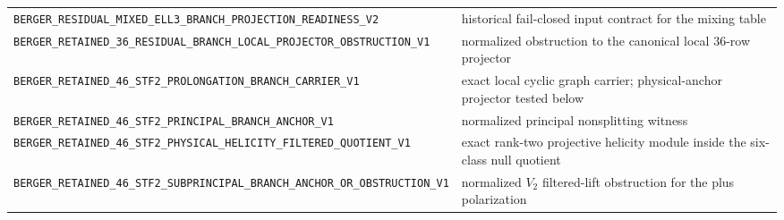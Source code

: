 \documentclass[11pt]{article}
\theoremstyle{definition}
\theoremstyle{remark}
\newcommand{\cert}[1]{\nolinkurl{#1}}
\begin{document}
\begin{center}
\begin{tabularx}{\textwidth}{>{\small}p{}Y}
\cert{BERGER_RESIDUAL_MIXED_ELL3_BRANCH_PROJECTION_READINESS_V2}
 & historical fail-closed input contract for the mixing table\\
\cert{BERGER_RETAINED_36_RESIDUAL_BRANCH_LOCAL_PROJECTOR_OBSTRUCTION_V1}
 & normalized obstruction to the canonical local $36$-row projector\\
\cert{BERGER_RETAINED_46_STF2_PROLONGATION_BRANCH_CARRIER_V1}
 & exact local cyclic graph carrier; physical-anchor projector tested below\\
\cert{BERGER_RETAINED_46_STF2_PRINCIPAL_BRANCH_ANCHOR_V1}
 & normalized principal nonsplitting witness\\
\cert{BERGER_RETAINED_46_STF2_PHYSICAL_HELICITY_FILTERED_QUOTIENT_V1}
 & exact rank-two projective helicity module inside the six-class null quotient\\
\cert{BERGER_RETAINED_46_STF2_SUBPRINCIPAL_BRANCH_ANCHOR_OR_OBSTRUCTION_V1}
 & normalized $V_2$ filtered-lift obstruction for the plus polarization\\
\bottomrule
\end{tabularx}
\end{center}
\end{document}
